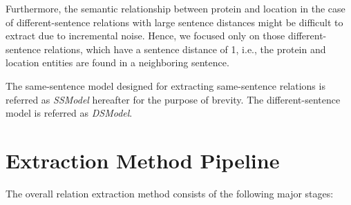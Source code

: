 Furthermore, the semantic relationship between protein and location in the case of different-sentence relations with large sentence distances might be difficult to extract due to incremental noise. Hence, we focused only on those different-sentence relations, which have a sentence distance of 1, i.e., the protein and location entities are found in a neighboring sentence.

The same-sentence model designed for extracting same-sentence relations is referred as \textit{SSModel} hereafter for the purpose of brevity. The different-sentence model is referred as \textit{DSModel}.

\section{Extraction Method Pipeline}\label{sec:pipeline}


The overall relation extraction method consists of the following major stages:

